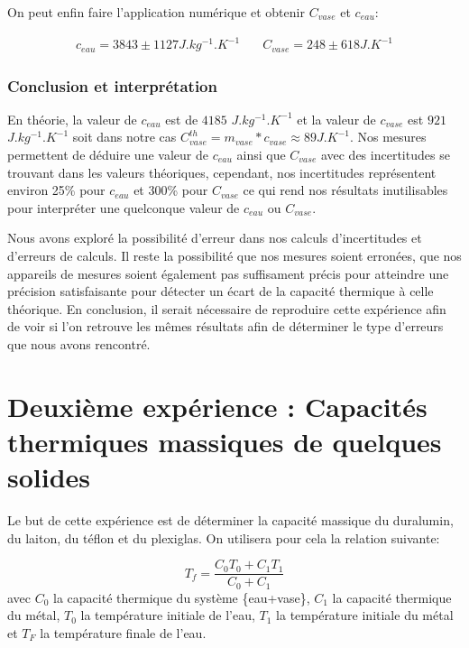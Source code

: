 \documentclass[12pt]{article}
\begin{document}
On peut enfin faire l'application numérique et obtenir $C_{vase}$ et $c_{eau}$:

\begin{align}
	c_{eau} = 3843 \pm 1127 J.kg^{-1}.K^{-1} & \quad C_{vase} = 248 \pm 618 J.K^{-1}
\end{align}


\subsubsection{Conclusion et interprétation}
En théorie, la valeur de $c_{eau}$ est de $4185$ $J.kg^{-1}.K^{-1}$ et la valeur de $c_{vase}$ est $921$ $J.kg^{-1}.K^{-1}$ soit dans notre cas $C_{vase}^{th} = m_{vase} * c_{vase} \approx 89 J.K^{-1}$. 
Nos mesures permettent de déduire une valeur de $c_{eau}$ ainsi que $C_{vase}$ avec des incertitudes se trouvant dans les valeurs théoriques, cependant, nos incertitudes représentent environ 25\% pour $c_{eau}$
et 300\% pour $C_{vase}$ ce qui rend nos résultats inutilisables pour interpréter une quelconque valeur de $c_{eau}$ ou $C_{vase}$. 

Nous avons exploré la possibilité d'erreur dans nos calculs d'incertitudes et d'erreurs de calculs. Il reste la possibilité que nos mesures soient erronées, que nos appareils de mesures soient également pas suffisament précis 
pour atteindre une précision satisfaisante pour détecter un écart de la capacité thermique à celle théorique. En conclusion, il serait nécessaire de reproduire cette expérience afin de voir si l'on retrouve les mêmes résultats afin de déterminer le type d'erreurs que nous avons rencontré.

\newpage
\section{Deuxième expérience : Capacités thermiques massiques de quelques solides}

Le but de cette expérience est de déterminer la capacité massique du duralumin, du laiton, du téflon et du plexiglas. On utilisera pour cela la relation suivante:

\begin{equation}
	T_f=\frac{C_0T_0+C_1T_1}{C_0+C_1}
\label{EquationTf}
\end{equation}
avec $C_0$ la capacité thermique du système \{eau+vase\}, $C_1$ la capacité thermique du métal, $T_0$ la température initiale de l'eau, $T_1$ la température initiale du métal et $T_F$ la température finale de l'eau.
\end{document}
